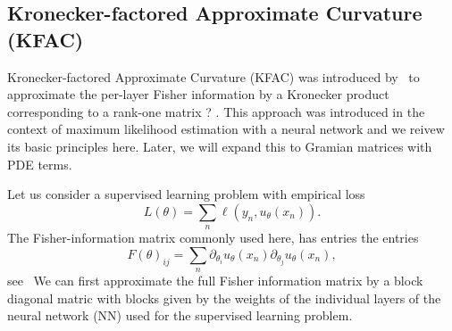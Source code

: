 \subsection{Kronecker-factored Approximate Curvature (KFAC)}


Kronecker-factored Approximate Curvature (KFAC) was introduced by~\citet{martens2015optimizing} to approximate the per-layer Fisher information by a Kronecker product corresponding to a rank-one matrix ? . 
This approach was introduced in the context of maximum likelihood estimation with a neural network and we reivew its basic principles here. 
Later, we will expand this to Gramian matrices with PDE terms. 

Let us consider a supervised learning problem with empirical loss 
\begin{equation}
  L(\theta) = \sum_{n} \ell(y_n, u_\theta(x_n)). 
\end{equation}
The Fisher-information matrix commonly used here, has entries the entries 
\begin{equation}
  F(\theta)_{ij} = \sum_{n} \partial_{\theta_i} u_\theta(x_n)\partial_{\theta_j} u_\theta(x_n),
\end{equation}
see~\cite[text]{amari2000natural,martens2020new}
We can first approximate the full Fisher information matrix by a block diagonal matric with blocks given by the weights of the individual layers of the neural network (NN) used for the supervised learning problem. 

